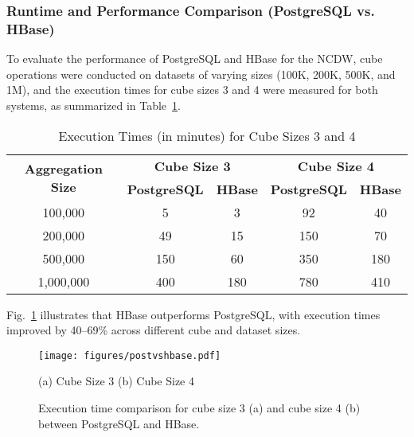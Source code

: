 










\subsubsection{Runtime and Performance Comparison (PostgreSQL vs. HBase) }
To evaluate the performance of PostgreSQL and HBase for the NCDW, cube operations were conducted on datasets of varying sizes (100K, 200K, 500K, and 1M), and the execution times for cube sizes 3 and 4 were measured for both systems, as summarized in Table~\ref{tab:cube34}.

\begin{table}[!h]
\centering
\caption{Execution Times (in minutes) for Cube Sizes 3 and 4}
\begin{tabular}{c|c|c|c|c}
\toprule
\multirow{2}{*}{\textbf{Aggregation Size}} & 
\multicolumn{2}{c|}{\textbf{Cube Size 3}} & 
\multicolumn{2}{c}{\textbf{Cube Size 4}} \\ 
 & \textbf{PostgreSQL} & \textbf{HBase} & \textbf{PostgreSQL} & \textbf{HBase} \\ 
 \hline
100,000   & 5    & 3    & 92   & 40   \\ \hline
200,000   & 49   & 15   & 150  & 70   \\ \hline
500,000   & 150  & 60   & 350  & 180  \\ \hline
1,000,000 & 400  & 180  & 780  & 410  \\ 
\bottomrule
\end{tabular}
\label{tab:cube34}
\end{table}




Fig.~\ref{fig:posthbs} illustrates that HBase outperforms PostgreSQL, with execution times improved by 40–69\% across different cube and dataset sizes.

\begin{figure}[h]
    \centering
    \texttt{[image: figures/postvshbase.pdf]}
    \begin{center}
       (a) Cube Size 3 \hspace{1.9cm} (b) Cube Size 4
    \end{center}
    \vspace{-4pt}
    \caption{Execution time comparison for cube size 3 (a) and cube size 4 (b) between PostgreSQL and HBase.}
    \label{fig:posthbs}
\end{figure}



